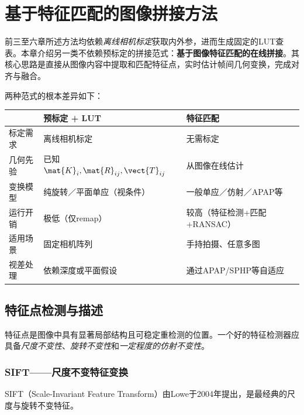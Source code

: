 \section{基于特征匹配的图像拼接方法}
\label{sec:feature-matching}

前三至六章所述方法均依赖\emph{离线相机标定}获取内外参，进而生成固定的LUT查表。本章介绍另一类不依赖预标定的拼接范式：\textbf{基于图像特征匹配的在线拼接}。其核心思路是直接从图像内容中提取和匹配特征点，实时估计帧间几何变换，完成对齐与融合。

两种范式的根本差异如下：
\begin{center}
\small
\begin{tabular}{p{4.5cm}p{4.5cm}p{4.5cm}}
\toprule
& \textbf{预标定 + LUT} & \textbf{特征匹配} \\
\midrule
标定需求 & 离线相机标定 & 无需标定 \\
几何先验 & 已知$\mat{K}_i,\mat{R}_{ij},\vect{T}_{ij}$ & 从图像在线估计 \\
变换模型 & 纯旋转／平面单应（视条件） & 一般单应／仿射／APAP等 \\
运行开销 & 极低（仅remap） & 较高（特征检测+匹配+RANSAC） \\
适用场景 & 固定相机阵列 & 手持拍摄、任意多图 \\
视差处理 & 依赖深度或平面假设 & 通过APAP/SPHP等自适应 \\
\bottomrule
\end{tabular}
\end{center}

\subsection{特征点检测与描述}
\label{sec:feature-detection}

特征点是图像中具有显著局部结构且可稳定重检测的位置。一个好的特征检测器应具备\emph{尺度不变性}、\emph{旋转不变性}和\emph{一定程度的仿射不变性}。

\subsubsection{SIFT——尺度不变特征变换}

SIFT（Scale-Invariant Feature Transform）由Lowe于2004年提出，是最经典的尺度与旋转不变特征。

